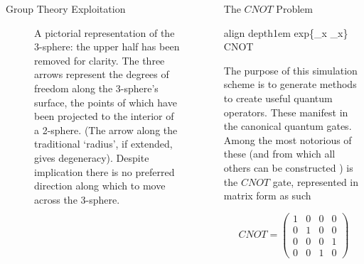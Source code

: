 \documentclass[12pt]{beamer}
\newcommand*\mystrut[1]{\vrule width0pt height0pt depth#1\relax}
\begin{document}
\begin{frame}
\begin{columns}
\begin{column}{.45\textwidth}
\begin{block}{Group Theory Exploitation}
\begin{figure}[htpb]
		\centering
		\caption{A pictorial representation of the 3-sphere: the upper half has been removed for clarity. The three arrows represent the degrees of freedom along the 3-sphere's surface, the points of which have been projected to the interior of a 2-sphere. (The arrow along the traditional `radius', if extended, gives degeneracy). Despite implication there is no preferred direction along which to move across the 3-sphere.}
	\end{figure}


\end{block}


					\end{column}
			
			\begin{column}{.45\textwidth}

	
			\begin{exampleblock}{The $CNOT$ Problem}

	\begin{empheq}[box=\fbox]{align}
		\mystrut{1em} exp\{\sigma_x \otimes \sigma_x\} \mapsto CNOT
	\end{empheq}

	The purpose of this simulation scheme is to generate methods to create useful quantum operators. These manifest in the canonical quantum gates. Among the most notorious of these (and from which all others can be constructed \cite{oliviera}) is the $CNOT$ gate, represented in matrix form as such

	\begin{equation}
	CNOT = 
	\begin{pmatrix}
		1  &  0  &  0  &  0  \\
		0  &  1  &  0  &  0  \\
		0  &  0  &  0  &  1  \\
		0  &  0  &  1  &  0 
	\end{pmatrix}
	\end{equation}


\end{exampleblock}
\end{column}
\end{columns}
\end{frame}
\end{document}

